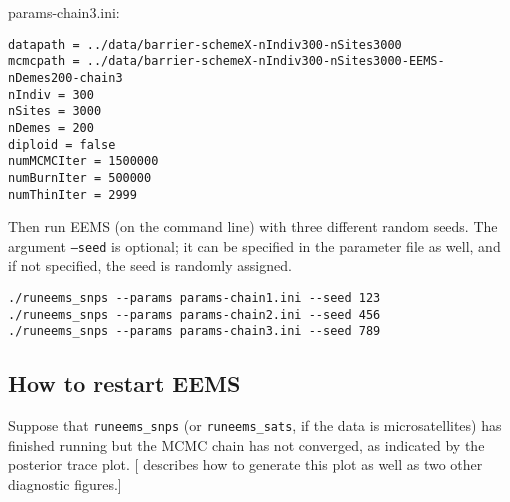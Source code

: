 \documentclass[a4paper,10pt,DIV=15,titlepage,mpinclude=true]{scrartcl}
\newcommand{\keystring}[1]{{\tt #1}}
\begin{document}
\noindent params-chain3.ini:
\begin{lstlisting}[style=Cppcode]
datapath = ../data/barrier-schemeX-nIndiv300-nSites3000
mcmcpath = ../data/barrier-schemeX-nIndiv300-nSites3000-EEMS-nDemes200-chain3
nIndiv = 300
nSites = 3000
nDemes = 200
diploid = false
numMCMCIter = 1500000
numBurnIter = 500000
numThinIter = 2999
\end{lstlisting}

Then run EEMS (on the command line) with three different random seeds. The argument \keystring{--seed} is optional; it can be specified in the parameter file as well, and if not specified, the seed is randomly assigned.

\begin{lstlisting}[style=Cppcode]
./runeems_snps --params params-chain1.ini --seed 123
./runeems_snps --params params-chain2.ini --seed 456
./runeems_snps --params params-chain3.ini --seed 789
\end{lstlisting}


\subsection{How to restart EEMS}

Suppose that \keystring{runeems\_snps} (or \keystring{runeems\_sats}, if the data is microsatellites) has finished running but the MCMC chain has not converged, as indicated by the posterior trace plot. [ describes how to generate this plot as well as two other diagnostic figures.]
\end{document}
